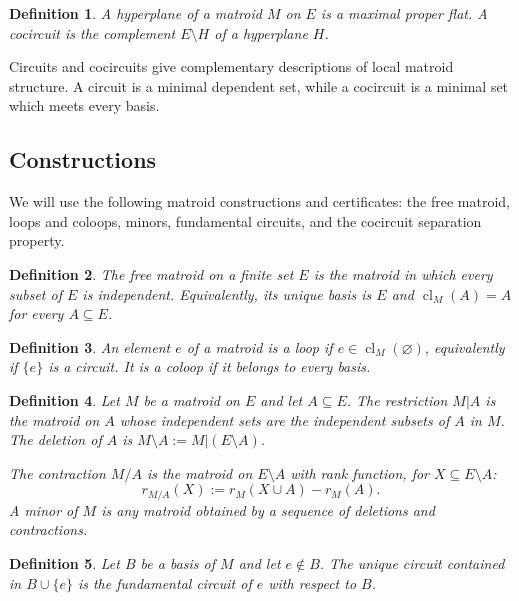 \documentclass[11pt]{article}
\numberwithin{equation}{section}
\newtheorem{definition}{Definition}[section]
\theoremstyle{remark}
\newcommand{\cl}{\operatorname{cl}}
\begin{document}
\begin{definition}
\label{def:hyperplane-cocircuit}
A \emph{hyperplane} of a matroid $M$ on $E$ is a maximal proper flat. A \emph{cocircuit} is the complement $E\setminus H$ of a hyperplane $H$.
\end{definition}

Circuits and cocircuits give complementary descriptions of local matroid structure. A circuit is a minimal dependent set, while a cocircuit is a minimal set which meets every basis.


\subsection{Constructions}
\label{subsec:elementary-matroid-constructions}

We will use the following matroid constructions and certificates: the free
matroid, loops and coloops, minors, fundamental circuits, and the cocircuit
separation property.

\begin{definition}
\label{def:free-matroid}
The \emph{free matroid} on a finite set $E$ is the matroid in which every
subset of $E$ is independent. Equivalently, its unique basis is $E$ and
$\cl_M(A)=A$ for every $A\subseteq E$.
\end{definition}

\begin{definition}
\label{def:loop-coloop}
An element $e$ of a matroid is a \emph{loop} if
$e\in\cl_M(\varnothing)$, equivalently if $\{e\}$ is a circuit. It is a
\emph{coloop} if it belongs to every basis.
\end{definition}

\begin{definition}
\label{def:matroid-minors}
Let $M$ be a matroid on $E$ and let $A\subseteq E$.
The \emph{restriction} $M|A$ is the matroid on $A$ whose independent sets
are the independent subsets of $A$ in $M$. The \emph{deletion} of $A$ is
$M\setminus A:=M|(E\setminus A)$.

The \emph{contraction} $M/A$ is the matroid on $E\setminus A$ with rank
function, for $X\subseteq E\setminus A$:
\begin{equation}
    r_{M/A}(X)
    :=
    r_M(X\cup A)-r_M(A).
\end{equation}
A \emph{minor} of $M$ is any matroid obtained by a sequence of deletions and
contractions.
\end{definition}

\begin{definition}
\label{def:fundamental-circuit}
Let $B$ be a basis of $M$ and let $e\notin B$. The unique circuit contained in $B\cup\{e\}$ is the \emph{fundamental circuit of $e$ with respect to $B$}.
\end{definition}
\end{document}
